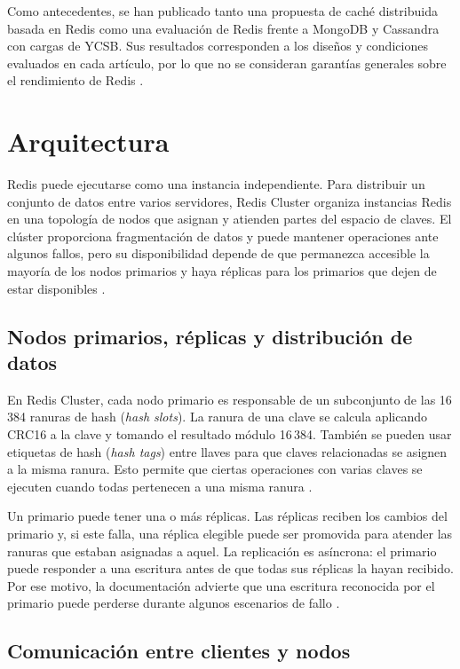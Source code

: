 \documentclass[12pt,a4paper]{article}
\begin{document}
Como antecedentes, se han publicado tanto una propuesta de caché distribuida basada en Redis como una evaluación de Redis frente a MongoDB y Cassandra con cargas de YCSB. Sus resultados corresponden a los diseños y condiciones evaluados en cada artículo, por lo que no se consideran garantías generales sobre el rendimiento de Redis \cite{shi2024distributed,kausar2022ycsb}.

\section{Arquitectura}

Redis puede ejecutarse como una instancia independiente. Para distribuir un conjunto de datos entre varios servidores, Redis Cluster organiza instancias Redis en una topología de nodos que asignan y atienden partes del espacio de claves. El clúster proporciona fragmentación de datos y puede mantener operaciones ante algunos fallos, pero su disponibilidad depende de que permanezca accesible la mayoría de los nodos primarios y haya réplicas para los primarios que dejen de estar disponibles \cite{redisClusterScaling,redisClusterSpec}.

\subsection{Nodos primarios, réplicas y distribución de datos}

En Redis Cluster, cada nodo primario es responsable de un subconjunto de las 16\,384 ranuras de hash (\textit{hash slots}). La ranura de una clave se calcula aplicando CRC16 a la clave y tomando el resultado módulo 16\,384. También se pueden usar etiquetas de hash (\textit{hash tags}) entre llaves para que claves relacionadas se asignen a la misma ranura. Esto permite que ciertas operaciones con varias claves se ejecuten cuando todas pertenecen a una misma ranura \cite{redisClusterSpec}.

Un primario puede tener una o más réplicas. Las réplicas reciben los cambios del primario y, si este falla, una réplica elegible puede ser promovida para atender las ranuras que estaban asignadas a aquel. La replicación es asíncrona: el primario puede responder a una escritura antes de que todas sus réplicas la hayan recibido. Por ese motivo, la documentación advierte que una escritura reconocida por el primario puede perderse durante algunos escenarios de fallo \cite{redisClusterScaling,redisReplication,redisClusterSpec}.

\subsection{Comunicación entre clientes y nodos}
\end{document}
